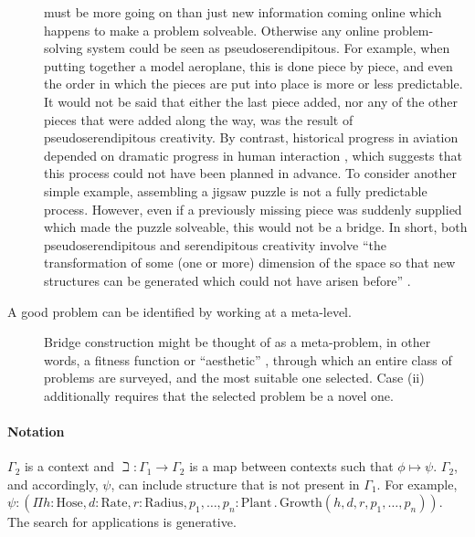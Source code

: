 \begin{description}
  must be more going on than just new information coming online which
  happens to make a problem solveable.  Otherwise any online
  problem-solving system could be seen as pseudoserendipitous.  For
  example, when putting together a model aeroplane, this is done piece
  by piece, and even the order in which the pieces are put into place
  is more or less predictable.  It would not be said that either the
  last piece added, nor any of the other pieces that were added along
  the way, was the result of pseudoserendipitous creativity.  By contrast,
  historical progress in aviation depended on dramatic progress in
  human interaction \cite[p.~292]{spenser2008airplane}, which
  suggests that this process could not have been planned in advance.
  To consider another simple example, assembling a jigsaw puzzle is
  not a fully predictable process.  However, even if a previously
  missing piece was suddenly supplied which made the puzzle solveable,
  this would not be a bridge.  In short, both pseudoserendipitous and
  serendipitous creativity involve ``the transformation of some (one
  or more) dimension of the space so that new structures can be
  generated which could not have arisen before''
  \cite[p.~348]{boden1998creativity}.
\item[A good problem can be identified by working at a meta-level.]
  Bridge construction might be thought of as a meta-problem, in other
  words, a fitness function or ``aesthetic''
  \cite{pease2011computational}, through which an entire class of
  problems are surveyed, and the most suitable one selected.  Case
  (ii) additionally requires that the selected problem be a novel one.
\end{description}

\paragraph{\textbf{\upshape Notation}}

$\Gamma_2$ is a context and $\beth : \Gamma_1 \rightarrow \Gamma_2$ is
a map between contexts such that $\phi \mapsto \psi$.  $\Gamma_2$, and
accordingly, $\psi$, can include structure that is not present in
$\Gamma_1$.  For example, $\psi : (\Pi h:\mathrm{Hose},
d:\mathrm{Rate}, r:\mathrm{Radius}, p_1,\ldots,p_n:\mathrm{Plant}
\mathbin{.}  \mathrm{Growth}(h,d,r,p_1,\ldots,p_n))$.  The search for
applications is generative.


